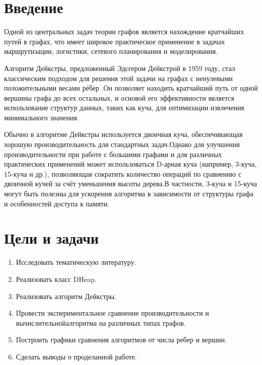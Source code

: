 \section*{Введение}

Одной из центральных задач теории графов является нахождение кратчайших путей в графах, что имеет широкое практическое применение в задачах маршрутизации, логистики, сетевого планирования и моделирования.\hfill

Алгоритм Дейкстры, предложенный Эдсгером Дейкстрой в 1959 году, стал классическим подходом для решения этой задачи на графах с ненулевыми положительными весами рёбер \cite{Dijkstra}.Он позволяет находить кратчайший путь от одной вершины графа до всех остальных, и основой его эффективности является использование структур данных, таких как куча, для оптимизации извлечения минимального значения.\hfill

Обычно в алгоритме Дейкстры используется двоичная куча, обеспечивающая хорошую производительность для стандартных задач.Однако для улучшения производительности при работе с большими графами и для различных практических применений может использоваться D-арная куча (например, 3-куча, 15-куча и др.), позволяющая сократить количество операций по сравнению с двоичной кучей за счёт уменьшения высоты дерева.В частности, 3-куча и 15-куча могут быть полезны для ускорения алгоритма в зависимости от структуры графа и особенностей доступа к памяти.

\section*{Цели и задачи}
\begin{enumerate}
    \item Исследовать тематическую литературу.
    \item Реализовать класс DHeap.
    \item Реализовать алгоритм Дейкстры.
    \item Провести экспериментальное сравнение производительности и вычислительной алгоритма на различных типах графов.
    \item Построить графики сравнения алгоритмов от числа ребер и вершин.
    \item Сделать выводы о проделанной работе.
\end{enumerate}
